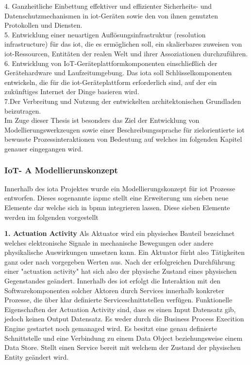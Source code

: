 \documentclass[a4paper, 12pt, twoside, headsepline=true]{scrartcl} %
\begin{document}
4. Ganzheitliche Einbettung effektiver und effizienter Sicherheits- und Datenschutzmechanismen in \ac{iot}-Geräten sowie den von ihnen genutzten Protokollen und Diensten.
\\

5. Entwicklung einer neuartigen Auflösungsinfrastruktur (resolution infrastructure) für das \ac{iot}, die es ermöglichen soll, ein skalierbares zuweisen von \ac{iot}-Ressourcen, Entitäten der realen Welt und ihrer Assoziationen durchzuführen.
\\

6. Entwicklung von IoT-Geräteplattformkomponenten einschließlich der Gerätehardware und Laufzeitumgebung. Das \ac{iota} soll Schlüsselkomponenten entwickeln, die für die \ac{iot}-Geräteplattform erforderlich sind, auf der ein zukünftiges Internet der Dinge basieren wird. 
\\

7.Der Verbreitung und Nutzung der entwickelten architektonischen Grundladen beizutragen.
\\

Im Zuge dieser Thesis ist besonders das Ziel der Entwicklung von Modellierungswerkzeugen sowie einer Beschreibungssprache für zielorientierte \ac{iot} bewusste Prozessinteraktionen von Bedeutung auf welches im folgenden Kapitel genauer eingegangen wird. 

\subsubsection{IoT- A Modellierunskonzept}
Innerhalb des \ac{iota} Projektes wurde ein Modellierungskonzept für \ac{iot} Prozesse entworfen. Dieses sogenannte \ac{iapmc} stellt eine Erweiterung um sieben neue Elemente dar welche sich in \ac{bpmn} integrieren lassen. Diese sieben Elemente werden im folgenden vorgestellt
\newline

\textbf{1. Actuation Activity}
\newline
Als Aktuator wird ein physisches Bauteil bezeichnet welches elektronische Signale in mechanische Bewegungen oder andere physikalische Auswirkungen umsetzen kann. Ein Aktuator fürht also Tätigkeiten ganz oder nach vorgegeben Werten aus. Nach der erfolgreichen Durchführung einer "actuation activity" hat sich also der physische Zustand eines physischen Gegenstandes geändert. Innerhalb des \ac{iot} erfolgt die Interaktion mit den Softwarekomponenten solcher Aktoren durch Services innerhalb konkreter Prozesse, die über klar definierte Serviceschnittstellen verfügen. Funktionelle Eigenschaften der Actuation Activity sind, dass es einen Input Datensatz gib, jedoch keinen Output Datensatz. Es weder durch die Business Process Execition Engine gestartet noch gemanaged wird. Es besitzt eine genau definierte Schnittstelle und eine Verbindung zu einem Data Object beziehungsweise einem Data Store. Stellt einen Service bereit mit welchem der Zustand der physischen Entity geändert wird.
\\
\end{document}
